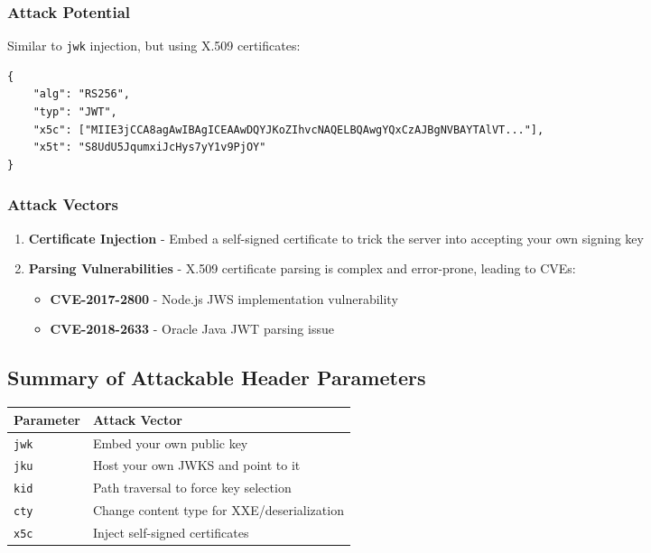 \documentclass{article}
\begin{document}
\subsubsection{Attack Potential}

Similar to \texttt{jwk} injection, but using X.509 certificates:

\begin{lstlisting}[caption=x5c Header Example]
{
    "alg": "RS256",
    "typ": "JWT",
    "x5c": ["MIIE3jCCA8agAwIBAgICEAAwDQYJKoZIhvcNAQELBQAwgYQxCzAJBgNVBAYTAlVT..."],
    "x5t": "S8UdU5JqumxiJcHys7yY1v9PjOY"
}
\end{lstlisting}

\subsubsection{Attack Vectors}

\begin{enumerate}
    \item \textbf{Certificate Injection} - Embed a self-signed certificate to trick the server into accepting your own signing key
    \item \textbf{Parsing Vulnerabilities} - X.509 certificate parsing is complex and error-prone, leading to CVEs:
    \begin{itemize}
        \item \textbf{CVE-2017-2800} - Node.js JWS implementation vulnerability
        \item \textbf{CVE-2018-2633} - Oracle Java JWT parsing issue
    \end{itemize}
\end{enumerate}

\subsection{Summary of Attackable Header Parameters}

\begin{tabular}{|l|l|}
\hline
\textbf{Parameter} & \textbf{Attack Vector} \\
\hline
\texttt{jwk} & Embed your own public key \\
\texttt{jku} & Host your own JWKS and point to it \\
\texttt{kid} & Path traversal to force key selection \\
\texttt{cty} & Change content type for XXE/deserialization \\
\texttt{x5c} & Inject self-signed certificates \\
\hline
\end{tabular}
\end{document}
